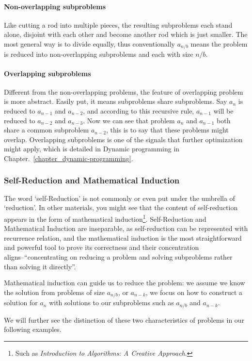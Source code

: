 \documentclass[../main.tex]{subfiles}
\begin{document}
\paragraph{Non-overlapping subproblems} Like cutting a rod into multiple pieces, the resulting  subproblems each stand alone, disjoint with each other and become another rod which is just smaller. The most general way is to divide equally,  thus conventionally $a_{n/b}$ means the problem is reduced into non-overlapping subproblems and each with size $n/b$. 

\paragraph{Overlapping subproblems} Different from the non-overlapping problems, the feature of overlapping problem is more abstract. Easily put, it means subproblems share subproblems. Say $a_n$ is reduced to $a_{n-1}$ and $a_{n-2}$, and according to this recursive rule, $a_{n-1}$ will be reduced to $a_{n-2}$ and $a_{n-3}$. Now we can see that problem $a_n$ and $a_{n-1}$ both share a common subproblem $a_{n-2}$, this is to say that these problems might overlap. Overlapping subproblems is one of the signals that further optimization might apply, which is detailed in Dynamic programming in Chapter.~\ref{chapter_dynamic-programming}.


\subsubsection{Self-Reduction and Mathematical Induction}
The word `self-Reduction' is not commonly or even put under the umbrella of `reduction'. In other materials, you might see that the content of self-reduction appears in the form of mathematical induction\footnote{Such as \textit{Introduction to Algorithms: A Creative Approach}.}. Self-Reduction and Mathematical Induction  are  inseparable, as self-reduction can be represented with recurrence relation, and the mathematical induction is the most straightforward and powerful tool to  prove its correctness and their concentration aligns--``concentrating on reducing a problem and solving subproblems  rather than solving it directly''.

Mathematical induction can guide us to reduce the problem: we assume we know the solution from problems of size $a_{n/b}$, or $a_{n-k}$, we focus on how to construct a solution for $a_n$ with solutions to our subproblems such as $a_{n/b}$ and $a_{n-k}$. 
 
We will further see the distinction of these two characteristics of problems in our following examples.
\end{document}
